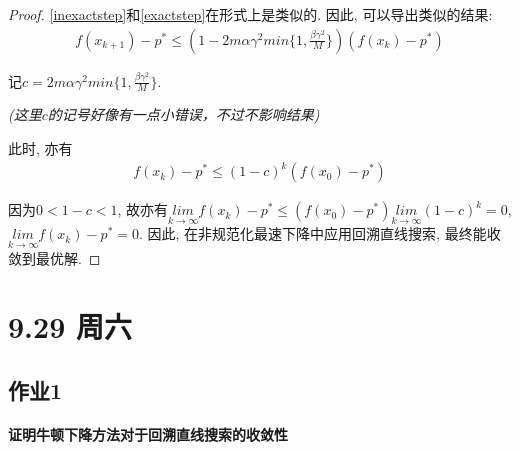 \documentclass[UTF8]{ctexart}
\theoremstyle{Defination}
\theoremstyle{remark}
\begin{document}
\begin{proof}
\autoref{inexactstep}和\autoref{exactstep}在形式上是类似的. 因此, 可以导出类似的结果: 
\begin{equation}
\begin{aligned}
f(x_{k+1})-p^*\leq(1-2m\alpha\gamma^2min\{1,\frac{\beta\gamma^2}{M}\})(f(x_k)-p^*)
\end{aligned}
\end{equation}

记$c=2m\alpha\gamma^2min\{1,\frac{\beta\gamma^2}{M}\}$.

\textit{(这里$c$的记号好像有一点小错误，不过不影响结果)}

此时, 亦有
\begin{equation}
\begin{aligned}
f(x_{k})-p^* \leq(1-c)^k(f(x_0)-p^*)
\end{aligned}
\end{equation}

因为$0<1-c<1$, 故亦有$\underset{k\to\infty}{lim}f(x_{k})-p^*\leq(f(x_0)-p^*)\underset{k\to\infty}{lim}(1-c)^k=0$, $\underset{k\to\infty}{lim}f(x_{k})-p^*=0$. 
因此, 在非规范化最速下降中应用回溯直线搜索, 最终能收敛到最优解. 

\end{proof}


\section*{9.29 周六}

\subsection*{作业1}

\paragraph{证明牛顿下降方法对于回溯直线搜索的收敛性}
\end{document}
